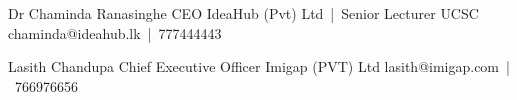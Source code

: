 

\begin{cventries}

    \cventry
    {Dr Chaminda Ranasinghe} %
    {CEO IdeaHub (Pvt) Ltd~|~Senior Lecturer} %
    {UCSC} %
    {chaminda@ideahub.lk~|~777444443} %
    {
    }

    \cventry
    {Lasith Chandupa } %
    {Chief Executive Officer} %
    {Imigap (PVT) Ltd} %
    {lasith@imigap.com~|~766976656} %
    {
    }

\end{cventries}
